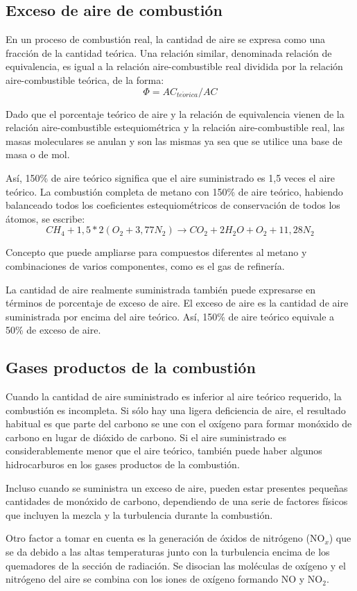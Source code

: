 \subsection{Exceso de aire de combustión}
\par En un proceso de combustión real, la cantidad de aire se expresa como una fracción de la cantidad teórica. Una relación similar, denominada relación de equivalencia, es igual a la relación aire-combustible real dividida por la relación aire-combustible teórica, de la forma:
\begin{equation}
    \Phi = AC_{te\acute{o}rica}/AC
\end{equation}
\par Dado que el porcentaje teórico de aire y la relación de equivalencia vienen de la relación aire-combustible estequiométrica y la relación aire-combustible real, las masas moleculares se anulan y son las mismas ya sea que se utilice una base de masa o de mol.
\par Así, 150\% de aire teórico significa que el aire suministrado es 1,5 veces el aire teórico. La combustión completa de metano con 150\% de aire teórico, habiendo balanceado todos los coeficientes estequiométricos de conservación de todos los átomos, se escribe:
\begin{equation}
CH_4 + 1,5*2(O_2 + 3,77N_2 ) \rightarrow CO_2 + 2H_2O + O_2 + 11,28N_2
\end{equation}
\par Concepto que puede ampliarse para compuestos diferentes al metano y combinaciones de varios componentes, como es el gas de refinería.
\par La cantidad de aire realmente suministrada también puede expresarse en términos de porcentaje de exceso de aire. El exceso de aire es la cantidad de aire suministrada por encima del aire teórico. Así, 150\% de aire teórico equivale a 50\% de exceso de aire.

\subsection{Gases productos de la combustión}
\par Cuando la cantidad de aire suministrado es inferior al aire teórico requerido, la combustión es incompleta. Si sólo hay una ligera deficiencia de aire, el resultado habitual es que parte del carbono se une con el oxígeno para formar monóxido de carbono en lugar de dióxido de carbono. Si el aire suministrado es considerablemente menor que el aire teórico, también puede haber algunos hidrocarburos en los gases productos de la combustión.
\par Incluso cuando se suministra un exceso de aire, pueden estar presentes pequeñas cantidades de monóxido de carbono, dependiendo de una serie de factores físicos que incluyen la mezcla y la turbulencia durante la combustión. 
\par Otro factor a tomar en cuenta es la generación de óxidos de nitrógeno (NO$_x$) que se da debido a las altas temperaturas junto con la turbulencia encima de los quemadores de la sección de radiación. Se disocian las moléculas de oxígeno y el nitrógeno del aire se combina con los iones de oxígeno formando NO y NO$_2$.


